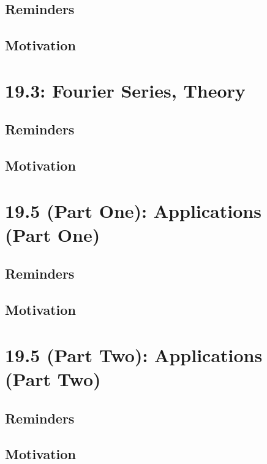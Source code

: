 \documentclass{report}
\begin{document}
\begin{sloppypar}
\section{Reminders}
\section{Motivation}
\chapter{19.3: Fourier Series, Theory}
\section{Reminders}
\section{Motivation}
\chapter{19.5 (Part One): Applications (Part One)}
\section{Reminders}
\section{Motivation}
\chapter{19.5 (Part Two): Applications (Part Two)}
\section{Reminders}
\section{Motivation}
\end{sloppypar}
\end{document}
